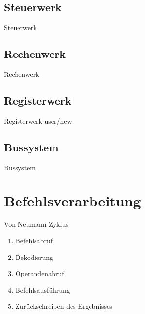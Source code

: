 \documentclass[handout]{beamer}
\begin{document}
\subsection{Steuerwerk}
\begin{frame}{Steuerwerk}

\end{frame}



\subsection{Rechenwerk}
\begin{frame}{Rechenwerk}

\end{frame}


\subsection{Registerwerk}
\begin{frame}{Registerwerk}
user/new
\end{frame}

\subsection{Bussystem}
\begin{frame}{Bussystem}

\end{frame}

\section{Befehlsverarbeitung}
\begin{frame}{Von-Neumann-Zyklus}
\begin{enumerate}\pause
\item{Befehlsabruf}\pause
\item{Dekodierung}\pause
\item{Operandenabruf}\pause
\item{Befehlsausf\"uhrung}\pause
\item{Zur\"uckschreiben des Ergebnisses}
\end{enumerate}
\end{frame}
\end{document}
